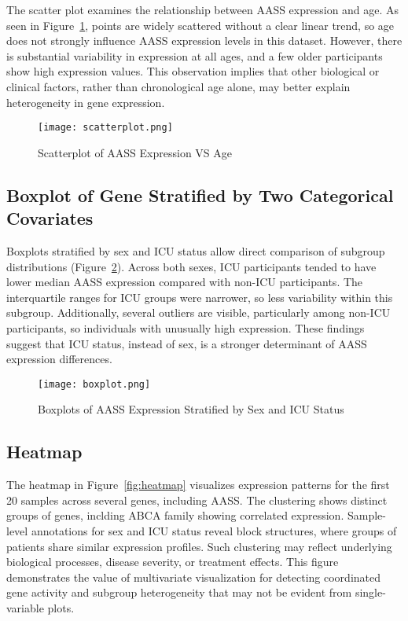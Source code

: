 \documentclass{article}
\begin{document}
The scatter plot examines the relationship between AASS expression and age. As seen in Figure~\ref{fig:scatter}, points are widely scattered without a clear linear trend, so age does not strongly influence AASS expression levels in this dataset. However, there is substantial variability in expression at all ages, and a few older participants show high expression values. This observation implies that other biological or clinical factors, rather than chronological age alone, may better explain heterogeneity in gene expression.

\begin{figure}[H]
  \centering
  \texttt{[image: scatterplot.png]}
  \caption{Scatterplot of AASS Expression VS Age}
  \label{fig:scatter}
\end{figure}




\subsection{Boxplot of Gene Stratified by Two Categorical Covariates}

Boxplots stratified by sex and ICU status allow direct comparison of subgroup distributions (Figure~\ref{fig:box}). Across both sexes, ICU participants tended to have lower median AASS expression compared with non-ICU participants. The interquartile ranges for ICU groups were narrower, so less variability within this subgroup. Additionally, several outliers are visible, particularly among non-ICU participants, so individuals with unusually high expression. These findings suggest that ICU status, instead of sex, is a stronger determinant of AASS expression differences.

\begin{figure}[H]
  \centering
  \texttt{[image: boxplot.png]}
  \caption{Boxplots of AASS Expression Stratified by Sex and ICU Status}
  \label{fig:box}
\end{figure}


\subsection{Heatmap}

The heatmap in Figure~\ref{fig:heatmap} visualizes expression patterns for the first 20 samples across several genes, including AASS. The clustering shows distinct groups of genes, inclding ABCA family showing correlated expression. Sample-level annotations for sex and ICU status reveal block structures, where groups of patients share similar expression profiles. Such clustering may reflect underlying biological processes, disease severity, or treatment effects. This figure demonstrates the value of multivariate visualization for detecting coordinated gene activity and subgroup heterogeneity that may not be evident from single-variable plots.
\end{document}
